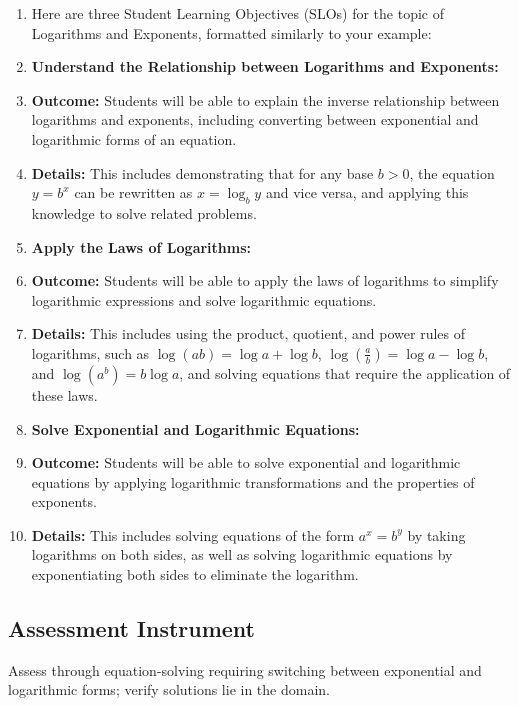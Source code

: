 \begin{enumerate}
    \item Here are three Student Learning Objectives (SLOs) for the topic of Logarithms and Exponents, formatted similarly to your example:
    \item \textbf{Understand the Relationship between Logarithms and Exponents:}
    \item \textbf{Outcome:} Students will be able to explain the inverse relationship between logarithms and exponents, including converting between exponential and logarithmic forms of an equation.
    \item \textbf{Details:} This includes demonstrating that for any base $ b > 0 $, the equation $ y = b^x $ can be rewritten as $ x = \log _b y $ and vice versa, and applying this knowledge to solve related problems.
    \item \textbf{Apply the Laws of Logarithms:}
    \item \textbf{Outcome:} Students will be able to apply the laws of logarithms to simplify logarithmic expressions and solve logarithmic equations.
    \item \textbf{Details:} This includes using the product, quotient, and power rules of logarithms, such as $ \log(ab) = \log a + \log b $, $ \log\left(\frac{a}{b}\right) = \log a - \log b $, and $ \log(a^b) = b\log a $, and solving equations that require the application of these laws.
    \item \textbf{Solve Exponential and Logarithmic Equations:}
    \item \textbf{Outcome:} Students will be able to solve exponential and logarithmic equations by applying logarithmic transformations and the properties of exponents.
    \item \textbf{Details:} This includes solving equations of the form $ a^x = b^y $ by taking logarithms on both sides, as well as solving logarithmic equations by exponentiating both sides to eliminate the logarithm.
\end{enumerate}


\subsection{Assessment Instrument}
\label{ssec:asse-3669}


Assess through equation-solving requiring switching between exponential
and logarithmic forms; verify solutions lie in the domain.

